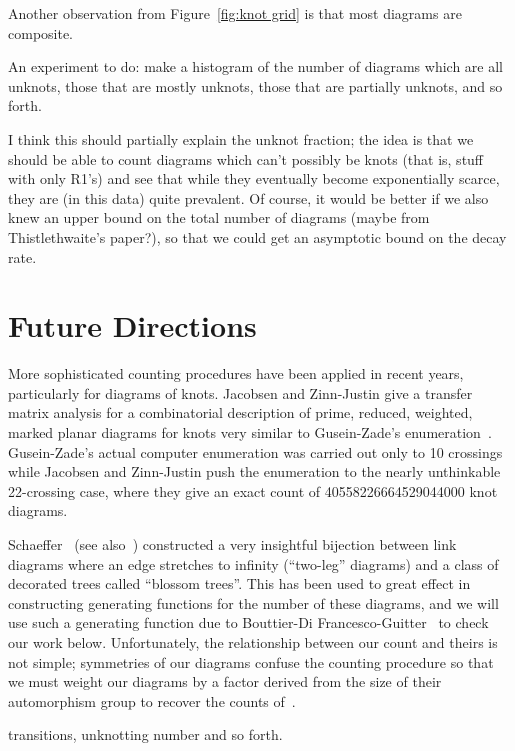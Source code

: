 \documentclass[amsmath,secnumarabic,floatfix,amssymb,nofootinbib,nobibnotes,letterpaper,11pt,tightenlines,showkeys]{revtex4}
\theoremstyle{definition}
\begin{document}
Another observation from Figure~\ref{fig:knot grid} is that most diagrams are composite. 

An experiment to do: make a histogram of the number of diagrams which are all unknots, those that are mostly unknots, those that are partially unknots, and so forth.

I think this should partially explain the unknot fraction; the idea is that we should be able to count diagrams which can't possibly be knots (that is, stuff with only R1's) and see that while they eventually become exponentially scarce, they are (in this data) quite prevalent. Of course, it would be better if we also knew an upper bound on the total number of diagrams (maybe from Thistlethwaite's paper?), so that we could get an asymptotic bound on the decay rate.


\section{Future Directions}

More sophisticated counting procedures have been applied in recent years, particularly for diagrams of knots. Jacobsen and Zinn-Justin\cite{Jacobsen:2002kia} give a transfer matrix analysis for a combinatorial description of prime, reduced, weighted, marked planar diagrams for knots very similar to Gusein-Zade's enumeration~\cite{GusenZade:1994wl,GusenZade:1998jz}. Gusein-Zade's actual computer enumeration was carried out only to 10 crossings while Jacobsen and Zinn-Justin push the enumeration to the nearly unthinkable 22-crossing case, where they give an exact count of 40558226664529044000 knot diagrams. 

Schaeffer~\cite{Schaeffer:1997wo} (see also~\cite{Bouttier:2002iu}) constructed a very insightful bijection between link diagrams where an edge stretches to infinity (``two-leg'' diagrams) and a class of decorated trees called ``blossom trees''. This has been used to great effect in constructing generating functions for the number of these diagrams, and we will use such a generating function due to Bouttier-Di Francesco-Guitter~\cite{Bouttier:2003ib} to check our work below. Unfortunately, the relationship between our count and theirs is not simple; symmetries of our diagrams confuse the counting procedure so that we must weight our diagrams by a factor derived from the size of their automorphism group to recover the counts of~\cite{Bouttier:2003ib}. 


transitions, unknotting number and so forth.
\end{document}
